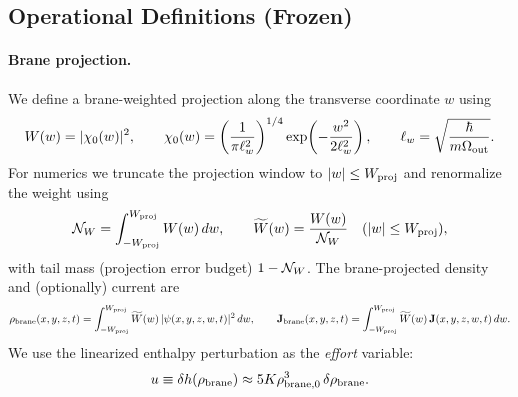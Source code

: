 

\subsection{Operational Definitions (Frozen)}
\label{sec:opdefs}

\paragraph{Brane projection.}
We define a brane-weighted projection along the transverse coordinate $w$ using
\begin{equation}
W(w) = |\chi_0(w)|^2,\qquad
\chi_0(w)=\left(\frac{1}{\pi\ell_w^2}\right)^{1/4}\exp\!\left(-\frac{w^2}{2\ell_w^2}\right),\qquad
\ell_w=\sqrt{\frac{\hbar}{m\Omega_{\rm out}}}.
\end{equation}
For numerics we truncate the projection window to $|w|\le W_{\rm proj}$ and renormalize the weight using
\begin{equation}
{\cal N}_W=\int_{-W_{\rm proj}}^{W_{\rm proj}} W(w)\,dw,\qquad
\widetilde W(w)=\frac{W(w)}{{\cal N}_W}\quad (|w|\le W_{\rm proj}),
\end{equation}
with tail mass (projection error budget) $1-{\cal N}_W$.
The brane-projected density and (optionally) current are
\begin{equation}
\rho_{\rm brane}(x,y,z,t)=\int_{-W_{\rm proj}}^{W_{\rm proj}} \widetilde W(w)\,|\psi(x,y,z,w,t)|^2\,dw,\qquad
\mathbf J_{\rm brane}(x,y,z,t)=\int_{-W_{\rm proj}}^{W_{\rm proj}} \widetilde W(w)\,\mathbf J(x,y,z,w,t)\,dw.
\end{equation}
We use the linearized enthalpy perturbation as the \emph{effort} variable:
\begin{equation}
u \equiv \delta h(\rho_{\rm brane}) \approx 5K\rho_{\rm brane,0}^3\,\delta\rho_{\rm brane}.
\end{equation}

